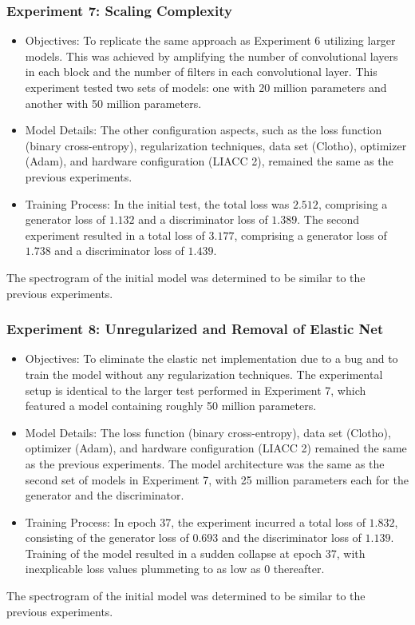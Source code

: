 \begin{frame}
    \frametitle{Experiment 7: Scaling Complexity}

    \begin{itemize}
        \item Objectives: To replicate the same approach as Experiment 6 utilizing larger models. This was achieved by amplifying the number of convolutional layers in each block and the number of filters in each convolutional layer. This experiment tested two sets of models: one with 20 million parameters and another with 50 million parameters.
        \item Model Details: The other configuration aspects, such as the loss function (binary cross-entropy), regularization techniques, data set (Clotho), optimizer (Adam), and hardware configuration (LIACC 2), remained the same as the previous experiments.
        \item Training Process: In the initial test, the total loss was $2.512$, comprising a generator loss of $1.132$ and a discriminator loss of $1.389$. The second experiment resulted in a total loss of $3.177$, comprising a generator loss of $1.738$ and a discriminator loss of $1.439$.
    \end{itemize}

    The spectrogram of the initial model was determined to be similar to the previous experiments.
\end{frame}

\begin{frame}
    \frametitle{Experiment 8: Unregularized and Removal of Elastic Net}

    \begin{itemize}
        \item Objectives: To eliminate the elastic net implementation due to a bug and to train the model without any regularization techniques. The experimental setup is identical to the larger test performed in Experiment 7, which featured a model containing roughly 50 million parameters.
        \item Model Details: The loss function (binary cross-entropy), data set (Clotho), optimizer (Adam), and hardware configuration (LIACC 2) remained the same as the previous experiments. The model architecture was the same as the second set of models in Experiment 7, with 25 million parameters each for the generator and the discriminator.
        \item Training Process: In epoch 37, the experiment incurred a total loss of $1.832$, consisting of the generator loss of $0.693$ and the discriminator loss of $1.139$. Training of the model resulted in a sudden collapse at epoch 37, with inexplicable loss values plummeting to as low as 0 thereafter.
    \end{itemize}

    The spectrogram of the initial model was determined to be similar to the previous experiments. 
\end{frame}


